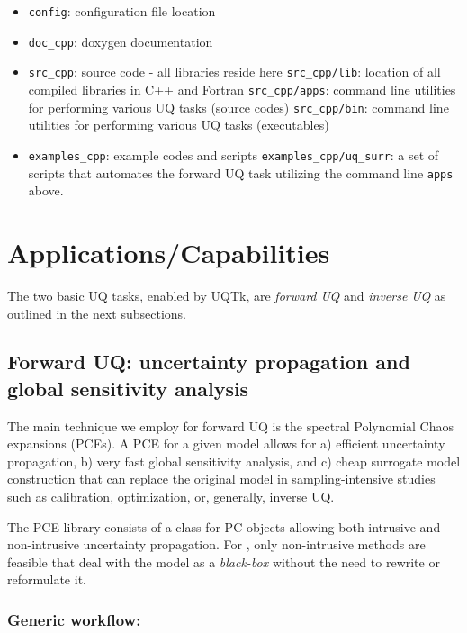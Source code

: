 \begin{itemize}
\item \texttt{config}: configuration file location
\item \texttt{doc\_cpp}: doxygen documentation
\item \texttt{src\_cpp}: source code - all libraries reside here
\subitem \texttt{src\_cpp/lib}: location of all compiled libraries in C++ and Fortran
\subitem \texttt{src\_cpp/apps}: command line utilities for performing various UQ tasks (source codes)
\subitem \texttt{src\_cpp/bin}: command line utilities for performing various UQ tasks (executables)
\item \texttt{examples\_cpp}: example codes and scripts
\subitem \texttt{examples\_cpp/uq\_surr}: a set of scripts that automates the forward UQ task utilizing the command line \texttt{apps} above.
\end{itemize}

\section{Applications/Capabilities}
\label{sec:uqapp}

The two basic UQ tasks, enabled by UQTk, are \emph{forward UQ} and \emph{inverse UQ} as outlined in the next subsections.

\subsection{Forward UQ: uncertainty propagation and global sensitivity analysis}
\label{subsec:fuq}

The main technique we employ for forward UQ is the spectral Polynomial Chaos expansions (PCEs). 
A PCE for a given model allows for a) efficient uncertainty propagation, b) very fast global sensitivity analysis, and 
c) cheap surrogate model construction that can replace the original model in sampling-intensive studies such as calibration, 
optimization, or, generally, inverse UQ.

The PCE library consists of a class for PC objects allowing both intrusive and non-intrusive uncertainty propagation. 
For \sstmacro, only non-intrusive methods are feasible that deal with the \sstmacro model as a \emph{black-box} without the need to rewrite or reformulate it.

\subsubsection{Generic workflow:}

